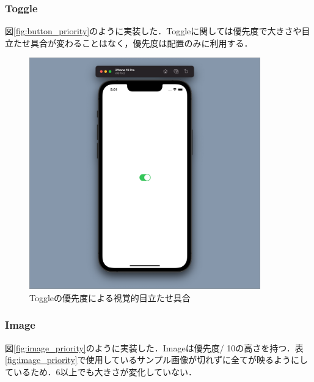 \subsubsection{Toggle}
図\ref{fig:button_priority}のように実装した．Toggleに関しては優先度で大きさや目立たせ具合が変わることはなく，優先度は配置のみに利用する．

\begin{figure}[htbp]
  \begin{minipage}{\hsize}
    \begin{center}
       \includegraphics[width=100mm]{img/Toggle_priority.png}
    \end{center}
    \caption{Toggleの優先度による視覚的目立たせ具合}
    \label{fig:toggle_priority}
  \end{minipage}
\end{figure}

\subsubsection{Image}
図\ref{fig:image_priority}のように実装した．Imageは優先度/ 10の高さを持つ．表\ref{fig:image_priority}で使用しているサンプル画像が切れずに全てが映るようにしているため．6以上でも大きさが変化していない．


